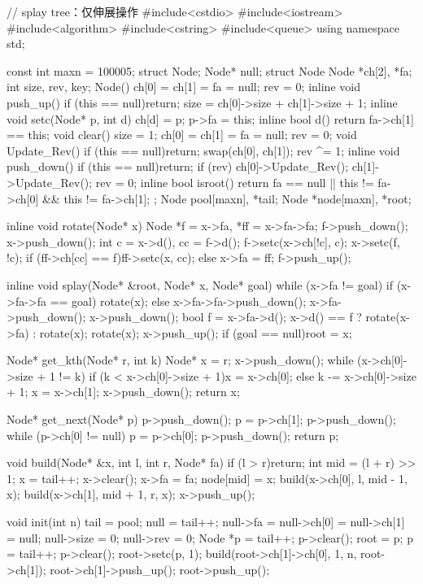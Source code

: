 \begin{lstlising}
// splay tree：仅伸展操作
#include<cstdio>
#include<iostream>
#include<algorithm>
#include<cstring>
#include<queue>
using namespace std;

const int maxn = 100005;
struct Node;
Node* null;
struct Node {
	Node *ch[2], *fa;
	int size, rev, key;
	Node() { ch[0] = ch[1] = fa = null; rev = 0; }
	inline void push_up() {
		if (this == null)return;
		size = ch[0]->size + ch[1]->size + 1;
	}
	inline void setc(Node* p, int d) {
		ch[d] = p;
		p->fa = this;
	}
	inline bool d() {
		return fa->ch[1] == this;
	}
	void clear() {
		size = 1;
		ch[0] = ch[1] = fa = null;
		rev = 0;
	}
	void Update_Rev() {
		if (this == null)return;
		swap(ch[0], ch[1]);
		rev ^= 1;
	}
	inline void push_down() {
		if (this == null)return;
		if (rev) {
			ch[0]->Update_Rev();
			ch[1]->Update_Rev();
			rev = 0;
		}
	}
	inline bool isroot() {
		return fa == null || this != fa->ch[0] && this != fa->ch[1];
	}
};
Node pool[maxn], *tail;
Node *node[maxn], *root;

inline void rotate(Node* x) {
	Node *f = x->fa, *ff = x->fa->fa;
	f->push_down();
	x->push_down();
	int c = x->d(), cc = f->d();
	f->setc(x->ch[!c], c);
	x->setc(f, !c);
	if (ff->ch[cc] == f)ff->setc(x, cc);
	else x->fa = ff;
	f->push_up();
}

inline void splay(Node* &root, Node* x, Node* goal) {
	while (x->fa != goal) {
		if (x->fa->fa == goal) rotate(x);
		else {
			x->fa->fa->push_down();
			x->fa->push_down();
			x->push_down();
			bool f = x->fa->d();
			x->d() == f ? rotate(x->fa) : rotate(x);
			rotate(x);
		}
	}
	x->push_up();
	if (goal == null)root = x;
}

Node* get_kth(Node* r, int k) {
	Node* x = r;
	x->push_down();
	while (x->ch[0]->size + 1 != k) {
		if (k < x->ch[0]->size + 1)x = x->ch[0];
		else {
			k -= x->ch[0]->size + 1;
			x = x->ch[1];
		}
		x->push_down();
	}
	return x;
}

Node* get_next(Node* p) {
	p->push_down();
	p = p->ch[1];
	p->push_down();
	while (p->ch[0] != null) {
		p = p->ch[0];
		p->push_down();
	}
	return p;
}

void build(Node* &x, int l, int r, Node* fa) {
	if (l > r)return;
	int mid = (l + r) >> 1;
	x = tail++;
	x->clear();
	x->fa = fa;
	node[mid] = x;
	build(x->ch[0], l, mid - 1, x);
	build(x->ch[1], mid + 1, r, x);
	x->push_up();
}

void init(int n) {
	tail = pool;
	null = tail++;
	null->fa = null->ch[0] = null->ch[1] = null;
	null->size = 0; null->rev = 0;
	Node *p = tail++;
	p->clear();
	root = p;
	p = tail++;
	p->clear();
	root->setc(p, 1);
	build(root->ch[1]->ch[0], 1, n, root->ch[1]);
	root->ch[1]->push_up();
	root->push_up();
}


\end{lstlising}
